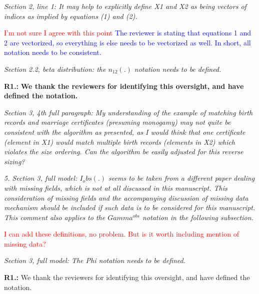\documentclass[letterpaper, parskip]{scrartcl}
\newcommand{\pointRaised}[1]{%
	\begin{tcolorbox}
		\itshape #1
	\end{tcolorbox}
}
\newcounter{responsectr}[section]     %
\newcommand{\reply}[2]{%
	\refstepcounter{responsectr}%
	\textbf{#1.\theresponsectr:} #2
}
\begin{document}
		\pointRaised{%
Section 2, line 1: It may help to explicitly define X1 and X2 as being vectors of indices as implied
by equations (1) and (2).
}
\textcolor{red}{I'm not sure I agree with this point}
\textcolor{blue}{The reviewer is stating that equations 1 and 2 are vectorized, so everything is else needs to be vectorized as well. In short, all notation needs to be consistent.}

		\pointRaised{%
Section 2.2, beta distribution: the $n_{12}(.)$ notation needs to be defined.
}
		\reply{R1}{%
			\textbf{We thank the reviewers for identifying this oversight, and have defined the notation.}
		}

		\pointRaised{%
Section 3, 4th full paragraph: My understanding of the example of matching birth records and
marriage certificates (presuming monogamy) may not quite be consistent with the algorithm as
presented, as I would think that one certificate (element in X1) would match multiple birth
records (elements in X2) which violates the size ordering. Can the algorithm be easily adjusted
for this reverse sizing?
}

\color{red}{I need some help addressing this in the paper. The answer is yes, the algorithm can easily be adapted for the reverse sizing. The issue is mostly notational. 

It seems as though Sadinle chose to label the datasets $X_1$ and $X_2$ such that $n_1 > n_2$ for mostly notational reasons. He uses the notation $Z_j = n_1 + j$ when record $j \in X_1$ has no match in $X_2$, which works because when $n_1 > n_2$, $n_1 + j$ never refers to any record in $X_2$. Jody uses the simplified notation $Z_j = n_1 + 1$ to refer to unmatched records, and this works for the same reason. 

However, when we relax the one-to-one constraint, or even encourage a modeller to allow multiple linkages in one dataset, we shouldn't denote the datasets according to simple notational convenience. This might require clever edits of the "Review of Prior Work" section, and other areas of the paper. 

Notationally, we can use  $Z_j = 0$ or $Z_j = -j$ as a way to unambiguously denote a record as nonmatching.

Additionally, we could just strike the paragraph about the advantages of many-to-one matchings, and keep this strictly a paper about bipartite matching}

		\pointRaised{%
5. Section 3, full model: $I_obs(.)$ seems to be taken from a different paper dealing with missing
fields, which is not at all discussed in this manuscript. This consideration of missing fields and
the accompanying discussion of missing data mechanism should be included if such data is to be
considered for this manuscript. This comment also applies to the $Gamma^{obs}$ notation in the
following subsection.
}
\textcolor{red}{I can add these definitions, no problem. But is it worth including mention of missing data?}
		\pointRaised{%
Section 3, full model: The Phi notation needs to be defined.
}
		\reply{R1}{%
	We thank the reviewers for identifying this oversight, and have defined the notation. 
}
\end{document}
